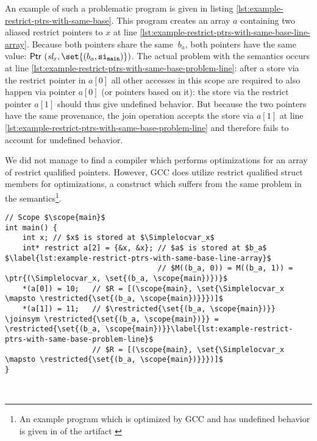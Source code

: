 An example of such a problematic program is given in listing \ref{lst:example-restrict-ptrs-with-same-base}.
This program creates an array $a$ containing two aliased restrict pointers to $x$ at line \ref{lst:example-restrict-ptrs-with-same-base-line-array}. 
Because both pointers share the same \Block $\ b_a$, both pointers have the same value: $\ptr{(\Simplelocvar_x, \set{(b_a, \scope{main})})}$. 
The actual problem with the semantics occurs at line \ref{lst:example-restrict-ptrs-with-same-base-problem-line}:
after a store via the restrict pointer in $a[0]$ all other accesses in this scope are required to also happen via
pointer $a[0]$ (or pointers based on it): the store via the restrict pointer $a[1]$ should thus give undefined behavior.
But because the two pointers have the same provenance, the join operation accepts the store via $a[1]$
at line \ref{lst:example-restrict-ptrs-with-same-base-problem-line} and therefore fails to account for undefined behavior.

We did not manage to find a compiler which performs optimizations for an array of restrict qualified pointers. 
However, GCC does utilize restrict qualified struct members for optimizations, a construct which suffers
from the same problem in the \cink{} semantics\footnote{An example program which is optimized by GCC and has undefined behavior is given in  of the artifact \cite{klappe_2024_11031862}}.

\begin{code}
\begin{verbatim}
// Scope $\scope{main}$
int main() {
    int x; // $x$ is stored at $\Simplelocvar_x$
    int* restrict a[2] = {&x, &x}; // $a$ is stored at $b_a$ $\label{lst:example-restrict-ptrs-with-same-base-line-array}$
                                   // $M((b_a, 0)) = M((b_a, 1)) = \ptr{(\Simplelocvar_x, \set{(b_a, \scope{main})})}$
    *(a[0]) = 10;   // $R = [(\scope{main}, \set{\Simplelocvar_x \mapsto \restricted{\set{(b_a, \scope{main})}}})]$
    *(a[1]) = 11;   // $\restricted{\set{(b_a, \scope{main})}} \joinsym \restricted{\set{(b_a, \scope{main})}} = \restricted{\set{(b_a, \scope{main})}}\label{lst:example-restrict-ptrs-with-same-base-problem-line}$
                    // $R = [(\scope{main}, \set{\Simplelocvar_x \mapsto \restricted{\set{(b_a, \scope{main})}}})]$
}
\end{verbatim}
\vspace*{-0.3cm}
\caption{Different restrict pointers with the same base (TLU)}
\label{lst:example-restrict-ptrs-with-same-base}
\end{code}
\leavevmode\\

